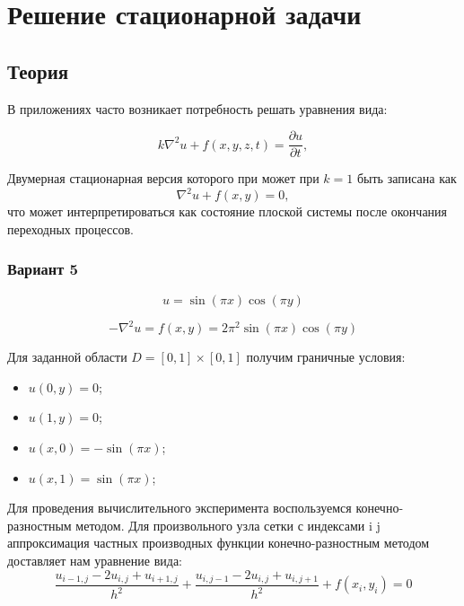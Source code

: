 \section{Решение стационарной задачи}

\subsection{Теория}

В приложениях часто возникает потребность решать уравнения вида:

\begin{equation}
    k\nabla^2 u + f(x,y,z,t) = \frac{\partial u}{\partial t},
\end{equation}

Двумерная стационарная версия которого при может при $k=1$ быть записана как
\begin{equation}
    \nabla^2 u + f(x,y) = 0,
\end{equation}
что может интерпретироваться как состояние плоской системы после окончания переходных процессов.

\subsubsection{Вариант 5}

\begin{equation}
    u = \sin(\pi x)\cos(\pi y)
\end{equation}

\begin{equation}
    -\nabla^2 u = f(x,y) = 2\pi^2\sin(\pi x)\cos(\pi y)
\end{equation}

Для заданной области $D = [0,1]\times[0,1]$ получим граничные условия:
\begin{itemize}
    \item $u(0,y) = 0$;
    \item $u(1,y) = 0$;
    \item $u(x,0) = -\sin(\pi x)$;
    \item $u(x,1) = \sin(\pi x)$;
\end{itemize}

Для проведения вычислительного эксперимента воспользуемся конечно-разностным методом. Для произвольного узла сетки с индексами i j аппроксимация частных производных функции конечно-разностным методом доставляет нам уравнение вида:
    \begin{equation}
    \frac{u_{i-1,j}-2u_{i,j}+u_{i+1,j}}{h^2}+\frac{u_{i,j-1}-2u_{i,j}+u_{i,j+1}}{h^2}+f(x_i, y_i) = 0
\end{equation}

